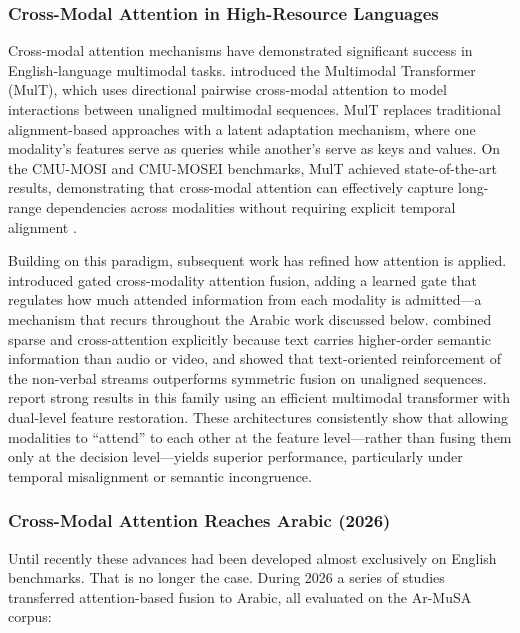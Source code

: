 \documentclass[12pt, a4paper]{article}
\begin{document}
\subsubsection{Cross-Modal Attention in High-Resource Languages}
Cross-modal attention mechanisms have demonstrated significant success in English-language multimodal tasks. \citet{Tsai2019} introduced the Multimodal Transformer (MulT), which uses directional pairwise cross-modal attention to model interactions between unaligned multimodal sequences. MulT replaces traditional alignment-based approaches with a latent adaptation mechanism, where one modality's features serve as queries while another's serve as keys and values. On the CMU-MOSI and CMU-MOSEI benchmarks, MulT achieved state-of-the-art results, demonstrating that cross-modal attention can effectively capture long-range dependencies across modalities without requiring explicit temporal alignment \citep{Tsai2019}.

Building on this paradigm, subsequent work has refined how attention is applied. \citet{Jiang2022} introduced gated cross-modality attention fusion, adding a learned gate that regulates how much attended information from each modality is admitted---a mechanism that recurs throughout the Arabic work discussed below. \citet{Wang2022} combined sparse and cross-attention explicitly because text carries higher-order semantic information than audio or video, and \citet{arXiv230713205v1} showed that text-oriented reinforcement of the non-verbal streams outperforms symmetric fusion on unaligned sequences. \citet{Sun2024} report strong results in this family using an efficient multimodal transformer with dual-level feature restoration. These architectures consistently show that allowing modalities to ``attend'' to each other at the feature level---rather than fusing them only at the decision level---yields superior performance, particularly under temporal misalignment or semantic incongruence.

\subsubsection{Cross-Modal Attention Reaches Arabic (2026)}\label{sec:arabic2026}
Until recently these advances had been developed almost exclusively on English benchmarks. That is no longer the case. During 2026 a series of studies transferred attention-based fusion to Arabic, all evaluated on the Ar-MuSA corpus:
\end{document}
